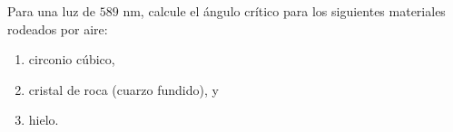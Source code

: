 \item Para una luz de $589\text{ nm}$, calcule el ángulo crítico para los siguientes materiales rodeados por aire:
\begin{enumerate}
    \item circonio cúbico,
    \item cristal de roca (cuarzo fundido), y
    \item hielo.
\end{enumerate}